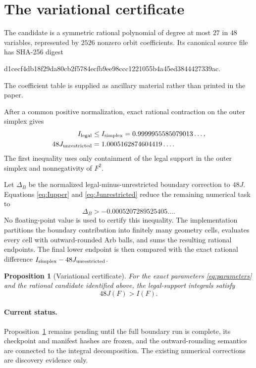 \documentclass[11pt]{amsart}
\newtheorem{proposition}[theorem]{Proposition}
\theoremstyle{definition}
\begin{document}
\section{The variational certificate}\label{sec:certificate}

The candidate is a symmetric rational polynomial of degree at most $27$ in
$48$ variables, represented by $2526$ nonzero orbit coefficients.  Its
canonical source file has SHA-256 digest
\begin{center}
{\small\ttfamily d1cecf4db18f29da80cb2f5784ecfb9ee98ccc1221055b4a45ed3844427339ac}.
\end{center}
The coefficient table is supplied as ancillary material rather than printed in
the paper.

After a common positive normalization, exact rational contraction on the
outer simplex gives
\begin{align}
 I_{\rm legal}&\leq I_{\rm simplex}
      =0.9999955585079013\ldots,\label{eq:Iupper}\\
 48J_{\rm unrestricted}&=1.0005162874604419\ldots.
      \label{eq:Junrestricted}
\end{align}
The first inequality uses only containment of the legal support in the outer
simplex and nonnegativity of $F^2$.

Let $\Delta_B$ be the normalized legal-minus-unrestricted boundary correction
to $48J$.  Equations \eqref{eq:Iupper} and
\eqref{eq:Junrestricted} reduce the remaining numerical task to
\begin{equation}\label{eq:boundary-target}
  \Delta_B>-0.0005207289525405\ldots.
\end{equation}
No floating-point value is used to certify this inequality.  The implementation
partitions the boundary contribution into finitely many geometry cells,
evaluates every cell with outward-rounded Arb balls, and sums the resulting
rational endpoints.  The final lower endpoint is then compared with the exact
rational difference $I_{\rm simplex}-48J_{\rm unrestricted}$.

\begin{proposition}[Variational certificate]\label{prop:variational}
For the exact parameters \eqref{eq:parameters} and the rational candidate
identified above, the legal-support integrals satisfy
\[
  48J(F)>I(F).
\]
\end{proposition}

\paragraph{Current status.}
Proposition~\ref{prop:variational} remains pending until the full boundary run
is complete, its checkpoint and manifest hashes are frozen, and the
outward-rounding semantics are connected to the integral decomposition.  The
existing numerical corrections are discovery evidence only.
\end{document}

